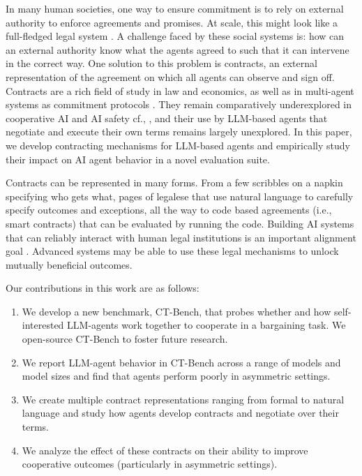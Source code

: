 \documentclass{article} %
\newcommand{\CT}{CT-Bench\xspace}
\begin{document}
In many human societies, one way to ensure commitment is to rely on external authority to enforce agreements and promises. At scale, this might look like a full-fledged legal system \citep{kolt2026legal}. A challenge faced by these social systems is: how can an external authority know what the agents agreed to such that it can intervene in the correct way. One solution to this problem is contracts, an external representation of the agreement on which all agents can observe and sign off. Contracts are a rich field of study in law and economics, as well as in multi-agent systems as commitment protocols \citep{singh1999ontology, desai2008checking}. They remain comparatively underexplored in cooperative AI and AI safety cf., \citep{hadfield2019incomplete}, and their use by LLM-based agents that negotiate and execute their own terms remains largely unexplored. In this paper, we develop contracting mechanisms for LLM-based agents and empirically study their impact on AI agent behavior in a novel evaluation suite. 

Contracts can be represented in many forms. From a few scribbles on a napkin specifying who gets what, pages of legalese that use natural language to carefully specify outcomes and exceptions, all the way to code based agreements (i.e., smart contracts) that can be evaluated by running the code. Building AI systems that can reliably interact with human legal institutions is an important alignment goal \citep{chen2025case}. Advanced systems may be able to use these legal mechanisms to unlock mutually beneficial outcomes.

Our contributions in this work are as follows:
\begin{enumerate}
\item We develop a new benchmark, \CT, that probes whether and how self-interested LLM-agents work together to cooperate in a bargaining task. We open-source \CT to foster future research. 

\item We report LLM-agent behavior in \CT across a range of models and model sizes and find that agents perform poorly in asymmetric settings. 

\item We create multiple contract representations ranging from formal to natural language and study how agents develop contracts and negotiate over their terms. 

\item We analyze the effect of these contracts on their ability to improve cooperative outcomes (particularly in asymmetric settings). 
\end{enumerate}
\end{document}
